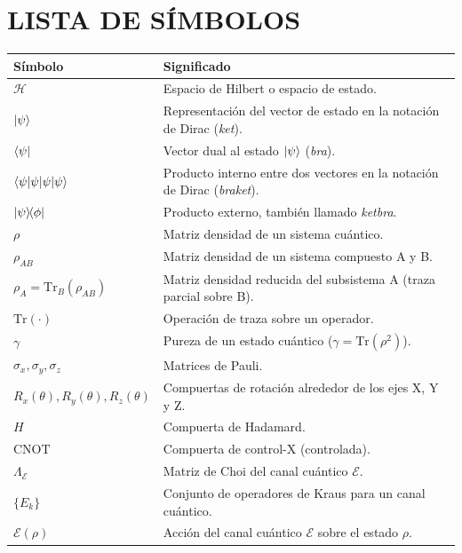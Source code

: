 \documentclass[letterpaper,12pt]{thesisECFM}
\theoremstyle{plain}
\theoremstyle{definition}
\theoremstyle{definition}
\theoremstyle{remark}
\newcommand{\1}{\mathbb{1}}
\begin{document}
\frontmatter
\tableofcontents    %
\chapter*{LISTA DE SÍMBOLOS}

\begin{longtable}{@{}p{4cm}p{11cm}@{}}  %
\textsf{Símbolo} & \textsf{Significado}\\[8pt]
\endhead

$\mathcal{H}$ & Espacio de Hilbert o espacio de estado.\\[6pt]
$\ket{\psi}$ & Representación del vector de estado en la notación de Dirac (\textit{ket}).\\[6pt]
$\bra{\psi}$ & Vector dual al estado $\ket{\psi}$ (\textit{bra}).\\[6pt]
$\braket{\psi|\psi}$ & Producto interno entre dos vectores en la notación de Dirac (\textit{braket}).\\[6pt]
$\ketbra{\psi}{\phi}$ & Producto externo, también llamado \textit{ketbra}.\\[6pt]
$\rho$ & Matriz densidad de un sistema cuántico.\\[6pt]
$\rho_{AB}$ & Matriz densidad de un sistema compuesto A y B.\\[6pt]
$\rho_A = \text{Tr}_B(\rho_{AB})$ & Matriz densidad reducida del subsistema A (traza parcial sobre B).\\[6pt]
$\text{Tr}(\cdot)$ & Operación de traza sobre un operador.\\[6pt]
$\gamma$ & Pureza de un estado cuántico ($\gamma = \text{Tr}(\rho^2)$).\\[6pt]
$\sigma_x, \sigma_y, \sigma_z$ & Matrices de Pauli.\\[6pt]
$R_x(\theta), R_y(\theta), R_z(\theta)$ & Compuertas de rotación alrededor de los ejes X, Y y Z.\\[6pt]
$H$ & Compuerta de Hadamard.\\[6pt]
$\text{CNOT}$ & Compuerta de control-X (controlada).\\[6pt]
$\Lambda_\mathcal{E}$ & Matriz de Choi del canal cuántico $\mathcal{E}$.\\[6pt]
$\{E_k\}$ & Conjunto de operadores de Kraus para un canal cuántico.\\[6pt]
$\mathcal{E}(\rho)$ & Acción del canal cuántico $\mathcal{E}$ sobre el estado $\rho$.\\[6pt]

\end{longtable}
\end{document}
